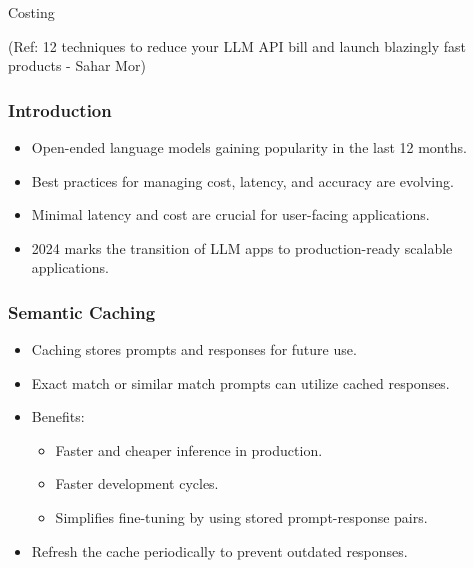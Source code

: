 \begin{frame}[fragile]\frametitle{}
\begin{center}
{\Large Costing}

{\tiny (Ref: 12 techniques to reduce your LLM API bill and launch blazingly fast products - Sahar Mor)}

\end{center}
\end{frame}

\begin{frame}[fragile]\frametitle{Introduction}
    \begin{itemize}
        \item Open-ended language models gaining popularity in the last 12 months.
        \item Best practices for managing cost, latency, and accuracy are evolving.
        \item Minimal latency and cost are crucial for user-facing applications.
        \item 2024 marks the transition of LLM apps to production-ready scalable applications.
    \end{itemize}
\end{frame}

\begin{frame}[fragile]\frametitle{Semantic Caching}
    \begin{itemize}
        \item Caching stores prompts and responses for future use.
        \item Exact match or similar match prompts can utilize cached responses.
        \item Benefits:
            \begin{itemize}
                \item Faster and cheaper inference in production.
                \item Faster development cycles.
                \item Simplifies fine-tuning by using stored prompt-response pairs.
            \end{itemize}
        \item Refresh the cache periodically to prevent outdated responses.
    \end{itemize}
\end{frame}

